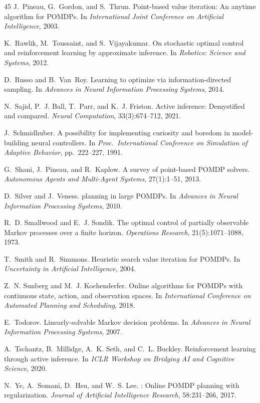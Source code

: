 \documentclass[runningheads]{llncs}
\begin{document}
\begin{thebibliography}{45}
J.~Pineau, G.~Gordon, and S.~Thrun.
\newblock Point-based value iteration: An anytime algorithm for {POMDP}s.
\newblock In \emph{International Joint Conference on Artificial Intelligence}, 2003.

K.~Rawlik, M.~Toussaint, and S.~Vijayakumar.
\newblock On stochastic optimal control and reinforcement learning by approximate inference.
\newblock In \emph{Robotics: Science and Systems}, 2012.

D.~Russo and B.~Van~Roy.
\newblock Learning to optimize via information-directed sampling.
\newblock In \emph{Advances in Neural Information Processing Systems}, 2014.

N.~Sajid, P.~J. Ball, T.~Parr, and K.~J. Friston.
\newblock Active inference: Demystified and compared.
\newblock \emph{Neural Computation}, 33(3):674--712, 2021.

J.~Schmidhuber.
\newblock A possibility for implementing curiosity and boredom in model-building neural controllers.
\newblock In \emph{Proc.\ International Conference on Simulation of Adaptive Behavior}, pp.\ 222--227, 1991.

G.~Shani, J.~Pineau, and R.~Kaplow.
\newblock A survey of point-based {POMDP} solvers.
\newblock \emph{Autonomous Agents and Multi-Agent Systems}, 27(1):1--51, 2013.

D.~Silver and J.~Veness.
 planning in large {POMDP}s.
\newblock In \emph{Advances in Neural Information Processing Systems}, 2010.

R.~D. Smallwood and E.~J. Sondik.
\newblock The optimal control of partially observable {M}arkov processes over a finite horizon.
\newblock \emph{Operations Research}, 21(5):1071--1088, 1973.

T.~Smith and R.~Simmons.
\newblock Heuristic search value iteration for {POMDP}s.
\newblock In \emph{Uncertainty in Artificial Intelligence}, 2004.

Z.~N. Sunberg and M.~J. Kochenderfer.
\newblock Online algorithms for {POMDP}s with continuous state, action, and observation spaces.
\newblock In \emph{International Conference on Automated Planning and Scheduling}, 2018.

E.~Todorov.
\newblock Linearly-solvable {M}arkov decision problems.
\newblock In \emph{Advances in Neural Information Processing Systems}, 2007.

A.~Tschantz, B.~Millidge, A.~K. Seth, and C.~L. Buckley.
\newblock Reinforcement learning through active inference.
\newblock In \emph{ICLR Workshop on Bridging AI and Cognitive Science}, 2020.

N.~Ye, A.~Somani, D.~Hsu, and W.~S. Lee.
: Online {POMDP} planning with regularization.
\newblock \emph{Journal of Artificial Intelligence Research}, 58:231--266, 2017.

\end{thebibliography}
\end{document}
